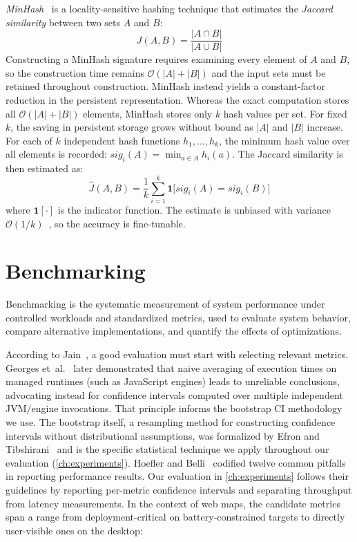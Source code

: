 \emph{MinHash}~\cite{broderResemblanceContainmentDocuments1998} is a locality-sensitive hashing technique that estimates the \emph{Jaccard similarity} between two sets $A$ and $B$:
\begin{equation}\label{eq:jaccard}
    J(A, B) = \frac{|A \cap B|}{|A \cup B|}
\end{equation}
Constructing a MinHash signature requires examining every element of $A$ and $B$, so the construction time remains $\mathcal{O}(|A|+|B|)$ and the input sets must be retained throughout construction.
MinHash instead yields a constant-factor reduction in the persistent representation.
Whereas the exact computation stores all $\mathcal{O}(|A|+|B|)$ elements, MinHash stores only $k$ hash values per set.
For fixed $k$, the saving in persistent storage grows without bound as $|A|$ and $|B|$ increase.
For each of $k$ independent hash functions $h_1, \ldots, h_k$, the minimum hash value over all elements is recorded: $\mathit{sig}_i(A) = \min_{a \in A} h_i(a)$.
The Jaccard similarity is then estimated as:
\begin{equation}\label{eq:minhash}
    \hat{J}(A, B) = \frac{1}{k} \sum_{i=1}^{k} \mathbf{1}\bigl[\mathit{sig}_i(A) = \mathit{sig}_i(B)\bigr]
\end{equation}
where $\mathbf{1}[\cdot]$ is the indicator function.
The estimate is unbiased with variance $\mathcal{O}(1/k)$~\cite{broderResemblanceContainmentDocuments1998}, so the accuracy is fine-tunable.


\section{Benchmarking}\label{sec:benchmarking}

Benchmarking is the systematic measurement of system performance under controlled workloads and standardized metrics, used to evaluate system behavior, compare alternative implementations, and quantify the effects of optimizations.

According to Jain~\cite{jainArtComputerSystems1991}, a good evaluation must start with selecting relevant metrics.
Georges et~al.~\cite{georgesStatisticallyRigorousJava2007} later demonstrated that naive averaging of execution times on managed runtimes (such as JavaScript engines) leads to unreliable conclusions, advocating instead for confidence intervals computed over multiple independent \ac{JVM}/engine invocations.
That principle informs the bootstrap CI methodology we use.
The bootstrap itself, a resampling method for constructing confidence intervals without distributional assumptions, was formalized by Efron and Tibshirani~\cite{efronIntroductionBootstrap1998} and is the specific statistical technique we apply throughout our evaluation (\cref{ch:experiments}).
Hoefler and Belli~\cite{hoeflerScientificBenchmarkingParallel2015} codified twelve common pitfalls in reporting performance results.
Our evaluation in \cref{ch:experiments} follows their guidelines by reporting per-metric confidence intervals and separating throughput from latency measurements.
In the context of web maps, the candidate metrics span a range from deployment-critical on battery-constrained targets to directly user-visible ones on the desktop:

